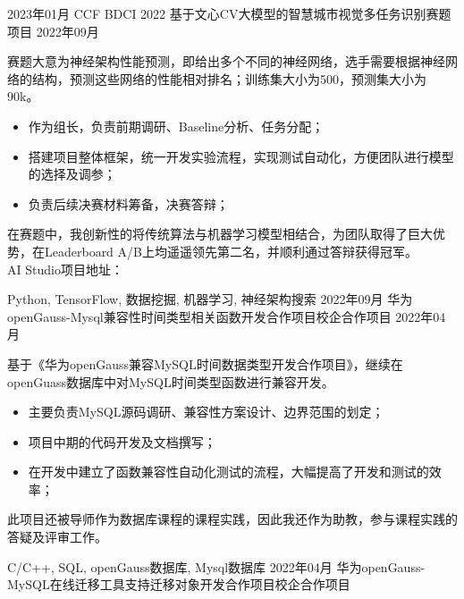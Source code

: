%
%


 
\begin{experiences}
  \experience
  {2023年01月} {CCF BDCI 2022 基于文心CV大模型的智慧城市视觉多任务识别}{赛题项目}{ }
  {2022年09月} {
    赛题大意为神经架构性能预测，即给出多个不同的神经网络，选手需要根据神经网络的结构，预测这些网络的性能相对排名；训练集大小为500，预测集大小为90k。
    \begin{itemize}
      \item  作为组长，负责前期调研、Baseline分析、任务分配；
      \item  搭建项目整体框架，统一开发实验流程，实现测试自动化，方便团队进行模型的选择及调参；
      \item  负责后续决赛材料筹备，决赛答辩；
    \end{itemize}
    在赛题中，我创新性的将传统算法与机器学习模型相结合，为团队取得了巨大优势，在Leaderboard A/B上均遥遥领先第二名，并顺利通过答辩获得冠军。 \\
    AI Studio项目地址：
                }
                {Python, TensorFlow, 数据挖掘, 机器学习, 神经架构搜索}
\emptySeparator	
 \experience
    {2022年09月} {华为openGauss-Mysql兼容性时间类型相关函数开发合作项目}{校企合作项目}{ }
    {2022年04月} {
      基于《华为openGauss兼容MySQL时间数据类型开发合作项目》，继续在openGuass数据库中对MySQL时间类型函数进行兼容开发。
      \begin{itemize}
        \item  主要负责MySQL源码调研、兼容性方案设计、边界范围的划定；
        \item  项目中期的代码开发及文档撰写；
        \item  在开发中建立了函数兼容性自动化测试的流程，大幅提高了开发和测试的效率；
      \end{itemize}
      此项目还被导师作为数据库课程的课程实践，因此我还作为助教，参与课程实践的答疑及评审工作。
                  }
                  {C/C++, SQL, openGauss数据库, Mysql数据库}
  \emptySeparator
  \experience
    {2022年04月} {华为openGauss-MySQL在线迁移工具支持迁移对象开发合作项目}{校企合作项目}{}

\end{experiences}
